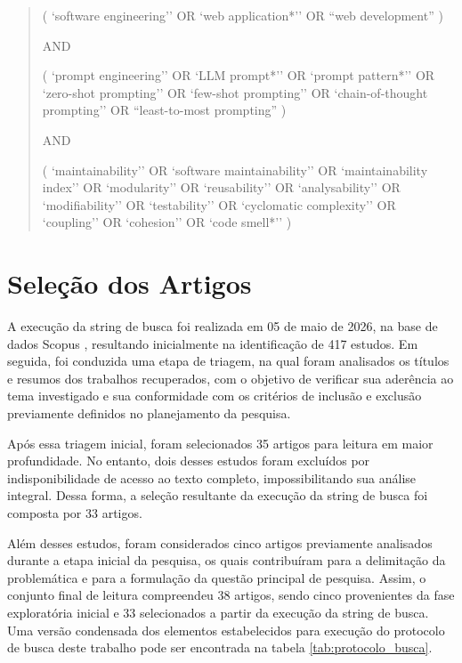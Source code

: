 \begin{quote}
\small
\ttfamily
(
`software engineering'' OR `web application*'' OR ``web development''
)

AND

(
`prompt engineering'' OR `LLM prompt*'' OR `prompt pattern*'' OR 
`zero-shot prompting'' OR `few-shot prompting'' OR 
`chain-of-thought prompting'' OR ``least-to-most prompting''
)

AND

(
`maintainability'' OR `software maintainability'' OR
`maintainability index'' OR `modularity'' OR `reusability'' OR 
`analysability'' OR `modifiability'' OR `testability'' OR
`cyclomatic complexity'' OR `coupling'' OR `cohesion'' OR 
`code smell*''
)
\end{quote}

\section{Seleção dos Artigos}

A execução da string de busca foi realizada em 05 de maio de 2026, na base de dados Scopus \cite{elsevier2024}, resultando inicialmente na identificação de 417 estudos. Em seguida, foi conduzida uma etapa de triagem, na qual foram analisados os títulos e resumos dos trabalhos recuperados, com o objetivo de verificar sua aderência ao tema investigado e sua conformidade com os critérios de inclusão e exclusão previamente definidos no planejamento da pesquisa.

Após essa triagem inicial, foram selecionados 35 artigos para leitura em maior profundidade. No entanto, dois desses estudos foram excluídos por indisponibilidade de acesso ao texto completo, impossibilitando sua análise integral. Dessa forma, a seleção resultante da execução da string de busca foi composta por 33 artigos.

Além desses estudos, foram considerados cinco artigos previamente analisados durante a etapa inicial da pesquisa, os quais contribuíram para a delimitação da problemática e para a formulação da questão principal de pesquisa. Assim, o conjunto final de leitura compreendeu 38 artigos, sendo cinco provenientes da fase exploratória inicial e 33 selecionados a partir da execução da string de busca. Uma versão condensada dos elementos estabelecidos para execução do protocolo de busca deste trabalho pode ser encontrada na tabela \ref{tab:protocolo_busca}.

